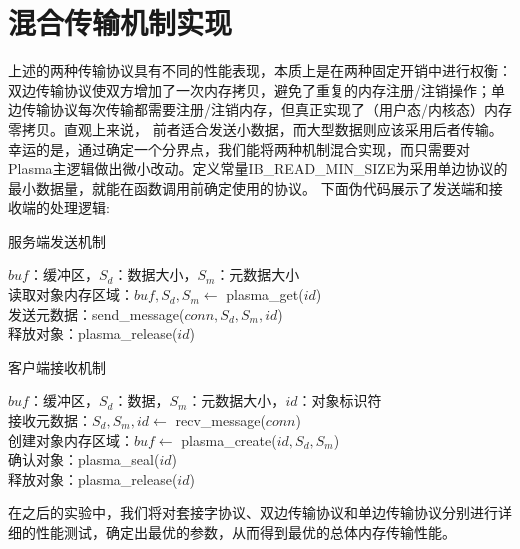 \section{混合传输机制实现}

上述的两种传输协议具有不同的性能表现，本质上是在两种固定开销中进行权衡：双边传输协议使双方增加了一次内存拷贝，避免了重复的内存注册/注销操作；单边传输协议每次传输都需要注册/注销内存，但真正实现了（用户态/内核态）内存零拷贝。直观上来说，
前者适合发送小数据，而大型数据则应该采用后者传输。幸运的是，通过确定一个分界点，我们能将两种机制混合实现，而只需要对Plasma主逻辑做出微小改动。定义常量IB\_READ\_MIN\_SIZE为采用单边协议的最小数据量，就能在函数调用前确定使用的协议。
下面伪代码展示了发送端和接收端的处理逻辑:

\begin{algorithm}[h]
	\caption{服务端发送机制}\label{server}
	$buf$：缓冲区，$S_d$：数据大小，$S_m$：元数据大小 \\
	读取对象内存区域：$buf, S_d, S_m \leftarrow$ plasma\_get($id$) \\
	发送元数据：send\_message($conn, S_d, S_m, id$) \\
	释放对象：plasma\_release($id$)
\end{algorithm}

\begin{algorithm}[h]
	\caption{客户端接收机制}\label{client}
	$buf$：缓冲区，$S_d$：数据，$S_m$：元数据大小，$id$：对象标识符 \\
	接收元数据：$S_d, S_m, id \leftarrow$ recv\_message($conn$) \\
	创建对象内存区域：$buf \leftarrow$ plasma\_create($id, S_d, S_m$) \\
	确认对象：plasma\_seal($id$) \\
	释放对象：plasma\_release($id$) \\
\end{algorithm}

在之后的实验中，我们将对套接字协议、双边传输协议和单边传输协议分别进行详细的性能测试，确定出最优的参数，从而得到最优的总体内存传输性能。